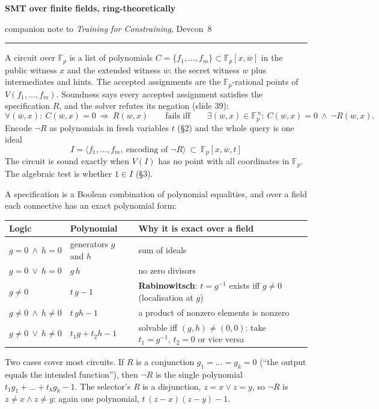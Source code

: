 \documentclass[10pt]{article}
\newcommand{\F}{\mathbb F}\newcommand{\wb}{\overline w}
\newcommand{\sect}[1]{\par\vspace{4pt}{\large\bfseries #1}\par\nobreak\vspace{1pt}}
\begin{document}
\small
{\LARGE\bfseries SMT over finite fields, ring-theoretically\par}\vspace{-2pt}
{\raggedleft\small companion note to \emph{Training for Constraining}, Devcon~8\par}\vspace{-4pt}
\rule{\textwidth}{0.4pt}

\sect{1. Soundness is a question about one ideal}
A circuit over $\F_p$ is a list of polynomials $C=\{f_1,\dots,f_m\}\subset\F_p[x,\wb]$ in the public witness $x$ and the extended
witness $\wb$: the secret witness $w$ plus intermediates and hints. The accepted assignments are the $\F_p$-rational points of
$V(f_1,\dots,f_m)$. Soundness says every accepted assignment satisfies the specification $R$, and the solver refutes its negation
(slide 39):
\[
\forall(\wb,x):\ C(\wb,x)=0\ \Rightarrow\ R(w,x)
\qquad\text{fails iff}\qquad
\exists(\wb,x)\in\F_p^{\,n}:\ C(\wb,x)=0\ \wedge\ \neg R(w,x).
\]
Encode $\neg R$ as polynomials in fresh variables $t$ (\S2) and the whole query is one ideal
\[
\boxed{\;I=\bigl\langle f_1,\dots,f_m,\ \text{encoding of }\neg R\bigr\rangle\ \subset\ \F_p[x,\wb,t]\;}
\]
The circuit is sound exactly when $V(I)$ has no point with all coordinates in $\F_p$. The algebraic test is whether $1\in I$ (\S3).

\sect{2. Encoding $\neg R$}
A specification is a Boolean combination of polynomial equalities, and over a field each connective has an exact polynomial form:
\begin{center}\begin{tabular}{@{}lll@{}}\toprule
Logic & Polynomial & Why it is exact over a field\\\midrule
$g=0\ \wedge\ h=0$ & generators $g$ and $h$ & sum of ideals\\
$g=0\ \vee\ h=0$ & $g\,h$ & no zero divisors\\
$g\neq0$ & $t\,g-1$ & \textbf{Rabinowitsch}: $t=g^{-1}$ exists iff $g\neq0$ (localisation at $g$)\\
$g\neq0\ \wedge\ h\neq0$ & $t\,gh-1$ & a product of nonzero elements is nonzero\\
$g\neq0\ \vee\ h\neq0$ & $t_1g+t_2h-1$ & solvable iff $(g,h)\neq(0,0)$: take $t_1=g^{-1},\,t_2=0$ or vice versa\\
\bottomrule\end{tabular}\end{center}
Two cases cover most circuits. If $R$ is a conjunction $g_1=\dots=g_k=0$ (``the output equals the intended function''), then
$\neg R$ is the single polynomial $t_1g_1+\dots+t_kg_k-1$. The selector's $R$ is a disjunction, $z=x\vee z=y$, so $\neg R$ is
$z\neq x\wedge z\neq y$: again one polynomial, $t\,(z-x)(z-y)-1$.
\end{document}
